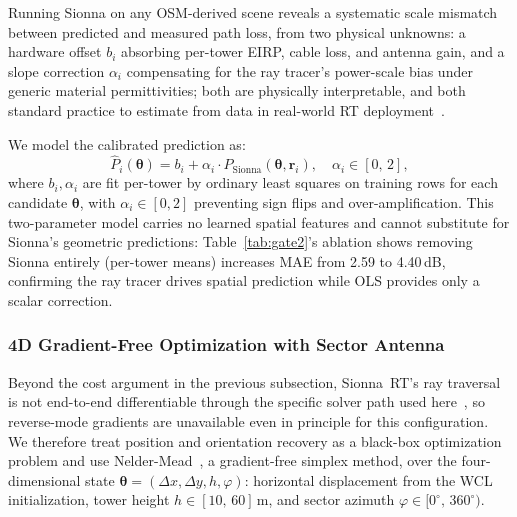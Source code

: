 \documentclass[conference]{IEEEtran}
\begin{document}
Running Sionna on any OSM-derived scene reveals a systematic scale
mismatch between predicted and measured path loss, from two physical
unknowns: a hardware offset $b_i$ absorbing per-tower EIRP, cable loss,
and antenna gain, and a slope correction $\alpha_i$ compensating for
the ray tracer's power-scale bias under generic material
permittivities; both are physically interpretable, and both standard
practice to estimate from data in real-world RT
deployment~\cite{manukyan2025sionna}.

We model the calibrated prediction as:
\begin{equation}
  \hat{P}_i(\boldsymbol{\theta}) = b_i + \alpha_i \cdot
    P_\text{Sionna}(\boldsymbol{\theta}, \mathbf{r}_i),
  \quad \alpha_i \in [0,\,2],
  \label{eq:ols}
\end{equation}
where $b_i, \alpha_i$ are fit per-tower by ordinary least squares on
training rows for each candidate $\boldsymbol{\theta}$, with
$\alpha_i \in [0,2]$ preventing sign flips and over-amplification.
This two-parameter model carries no learned spatial features and cannot
substitute for Sionna's geometric predictions: Table~\ref{tab:gate2}'s
ablation shows removing Sionna entirely (per-tower means) increases MAE
from 2.59 to 4.40\,dB, confirming the ray tracer drives spatial
prediction while OLS provides only a scalar correction.

\subsubsection{4D Gradient-Free Optimization with Sector Antenna}
\label{sec:4dnm}

Beyond the cost argument in the previous subsection, Sionna~RT's ray
traversal is not end-to-end differentiable through the specific
solver path used here~\cite{hoydis2023sionna}, so reverse-mode
gradients are unavailable even in principle for this configuration.
We therefore treat position and orientation recovery as a black-box
optimization problem and use Nelder-Mead~\cite{nelder1965simplex}, a
gradient-free simplex method, over the four-dimensional state
$\boldsymbol{\theta} = (\Delta x, \Delta y, h, \varphi)$: horizontal
displacement from the WCL initialization, tower height
$h \in [10,\,60]$\,m, and sector azimuth $\varphi \in [0^\circ,\,360^\circ)$.
\end{document}
